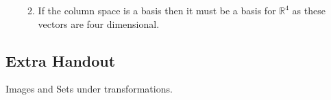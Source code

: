 \documentclass[11pt]{book}
\begin{document}
\begin{ex}
\begin{itemize}
\begin{enumerate}
\[                    \]
                \item If the column space is a basis then it must be a basis for $\mathbb{R}^{4}$ as these vectors are four dimensional.
            \end{enumerate}
    \end{itemize}
\end{ex}


\subsection{Extra Handout}%
\label{sub:extra_handout}

Images and Sets under transformations.
\end{document}
